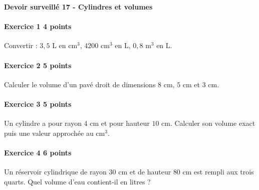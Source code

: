 \documentclass[a4paper,10pt]{article}
\newenvironment{exercice}[2]{\paragraph{Exercice #1 \hfill #2 points}\mbox{}\par}{\medskip}
\begin{document}
\begin{center}\Large\bfseries Devoir surveillé 17 - Cylindres et volumes\end{center}
\vspace{2mm}
\begin{exercice}{1}{4}Convertir : $3,5$ L en cm$^3$, $4200$ cm$^3$ en L, $0,8$ m$^3$ en L.\end{exercice}\begin{exercice}{2}{5}Calculer le volume d'un pavé droit de dimensions $8$ cm, $5$ cm et $3$ cm.\end{exercice}\begin{exercice}{3}{5}Un cylindre a pour rayon $4$ cm et pour hauteur $10$ cm. Calculer son volume exact puis une valeur approchée au cm$^3$.\end{exercice}\begin{exercice}{4}{6}Un réservoir cylindrique de rayon $30$ cm et de hauteur $80$ cm est rempli aux trois quarts. Quel volume d'eau contient-il en litres ?\end{exercice}
\end{document}
